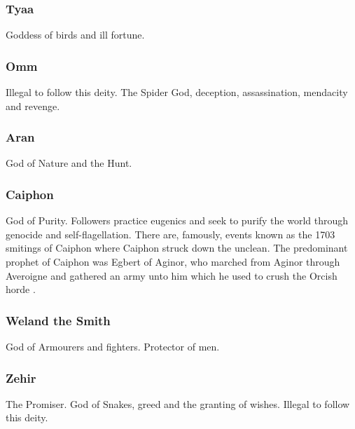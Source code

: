 \documentclass[a4paper]{style/dnd4e}
\begin{document}
\subsubsection*{Tyaa}   
Goddess of birds and ill fortune.


\subsubsection*{Omm}
Illegal to follow this deity.
The Spider God, deception, assassination, mendacity and revenge.


\subsubsection*{Aran}
God of Nature and the Hunt. 

\subsubsection*{Caiphon}
God of Purity.  Followers practice eugenics and seek to purify the world through genocide and 
self-flagellation.  There are, famously, events known as the 1703 smitings of Caiphon where 
Caiphon struck down the unclean.  The predominant prophet of Caiphon was Egbert of Aginor, who marched from Aginor through Averoigne and gathered an army unto him which he used to crush the Orcish horde .


\subsubsection*{Weland the Smith}
God of Armourers and fighters.  Protector of men.


\subsubsection*{Zehir}
The Promiser. God of Snakes, greed and the granting of wishes.  Illegal to follow this deity.
\end{document}
